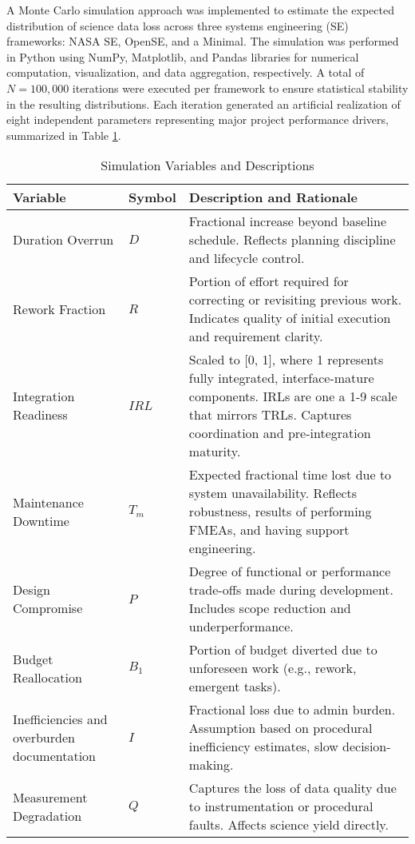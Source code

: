 A Monte Carlo simulation approach was implemented to estimate the expected distribution of science data loss across three systems engineering (SE) frameworks: NASA SE, OpenSE, and a Minimal.
The simulation was performed in Python using NumPy, Matplotlib, and Pandas libraries for numerical computation, visualization, and data aggregation, respectively.
A total of $N = 100{,}000$ iterations were executed per framework to ensure statistical stability in the resulting distributions. 
Each iteration generated an artificial realization of eight independent parameters representing major project performance drivers, summarized in Table \ref{tab:variables}.\\
\begin{table}[h!]
    \centering
    \caption{Simulation Variables and Descriptions}
    \label{tab:variables}
    \begin{tabular}{p{4cm}p{2cm}p{7cm}}
        \toprule
        \textbf{Variable} & \textbf{Symbol} & \textbf{Description and Rationale} \\
        \midrule
        Duration Overrun & $D$ & Fractional increase beyond baseline schedule. Reflects planning discipline and lifecycle control. \\
        Rework Fraction & $R$ & Portion of effort required for correcting or revisiting previous work. Indicates quality of initial execution and requirement clarity. \\
        Integration Readiness & $IRL$ & Scaled to [0, 1], where 1 represents fully integrated, interface-mature components. IRLs are one a 1-9 scale that mirrors TRLs\cite{gao2020tra}. Captures coordination and pre-integration maturity. \\
        Maintenance Downtime & $T_m$ & Expected fractional time lost due to system unavailability. Reflects robustness, results of performing FMEAs, and having support engineering. \\
        Design Compromise & $P$ & Degree of functional or performance trade-offs made during development. Includes scope reduction and underperformance. \\
        Budget Reallocation & $B_1$ & Portion of budget diverted due to unforeseen work (e.g., rework, emergent tasks). \\
        Inefficiencies and overburden documentation & $I$ & Fractional loss due to admin burden. Assumption based on procedural inefficiency estimates, slow decision-making.\\
        Measurement Degradation & $Q$ & Captures the loss of data quality due to instrumentation or procedural faults. Affects science yield directly. \\
        \bottomrule
    \end{tabular}
\end{table}
